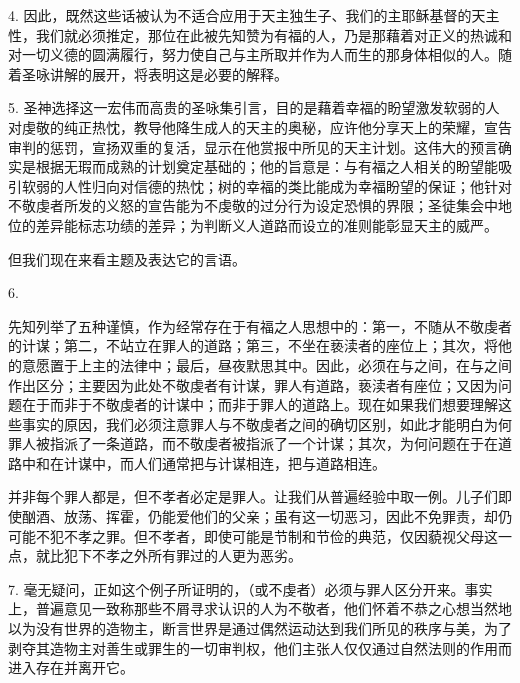 4. 因此，既然这些话被认为不适合应用于天主独生子、我们的主耶稣基督的天主性，我们就必须推定，那位在此被先知赞为有福的人，乃是那藉着对正义的热诚和对一切义德的圆满履行，努力使自己与主所取并作为人而生的那身体相似的人。随着圣咏讲解的展开，将表明这是必要的解释。\par

5. 圣神选择这一宏伟而高贵的圣咏集引言，目的是藉着幸福的盼望激发软弱的人对虔敬的纯正热忱，教导他降生成人的天主的奥秘，应许他分享天上的荣耀，宣告审判的惩罚，宣扬双重的复活，显示在他赏报中所见的天主计划。这伟大的预言确实是根据无瑕而成熟的计划奠定基础的；他的旨意是：与有福之人相关的盼望能吸引软弱的人性归向对信德的热忱；树的幸福的类比能成为幸福盼望的保证；他针对不敬虔者所发的义怒的宣告能为不虔敬的过分行为设定恐惧的界限；圣徒集会中地位的差异能标志功绩的差异；为判断义人道路而设立的准则能彰显天主的威严。\par

但我们现在来看主题及表达它的言语。\par

6. \par

先知列举了五种谨慎，作为经常存在于有福之人思想中的：第一，不随从不敬虔者的计谋；第二，不站立在罪人的道路；第三，不坐在亵渎者的座位上；其次，将他的意愿置于上主的法律中；最后，昼夜默思其中。因此，必须在与之间，在与之间作出区分；主要因为此处不敬虔者有计谋，罪人有道路，亵渎者有座位；又因为问题在于而非于不敬虔者的计谋中；而非于罪人的道路上。现在如果我们想要理解这些事实的原因，我们必须注意罪人与不敬虔者之间的确切区别，如此才能明白为何罪人被指派了一条道路，而不敬虔者被指派了一个计谋；其次，为何问题在于在道路中和在计谋中，而人们通常把与计谋相连，把与道路相连。\par

并非每个罪人都是，但不孝者必定是罪人。让我们从普遍经验中取一例。儿子们即使酗酒、放荡、挥霍，仍能爱他们的父亲；虽有这一切恶习，因此不免罪责，却仍可能不犯不孝之罪。但不孝者，即使可能是节制和节俭的典范，仅因藐视父母这一点，就比犯下不孝之外所有罪过的人更为恶劣。\par

7. 毫无疑问，正如这个例子所证明的，（或不虔者）必须与罪人区分开来。事实上，普遍意见一致称那些不屑寻求认识的人为不敬者，他们怀着不恭之心想当然地以为没有世界的造物主，断言世界是通过偶然运动达到我们所见的秩序与美，为了剥夺其造物主对善生或罪生的一切审判权，他们主张人仅仅通过自然法则的作用而进入存在并离开它。\par

